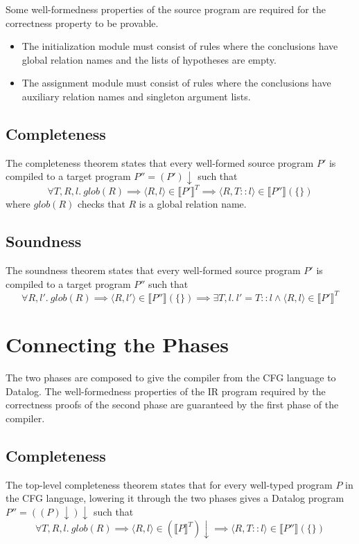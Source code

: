 \documentclass[11pt]{article}
\begin{document}
Some well-formedness properties of the source program are required for the correctness property to be provable.
\begin{itemize}
\item The initialization module must consist of rules where the conclusions have global relation names and the lists of hypotheses are empty.
\item The assignment module must consist of rules where the conclusions have auxiliary relation names and singleton argument lists.
\end{itemize}

\subsection{Completeness}
The completeness theorem states that every well-formed source program $P'$ is compiled to a target program $P'' = (P')\downarrow$ such that
\[
\forall T, R, l.~\mathit{glob}(R) \implies \langle R, l \rangle \in \llbracket P' \rrbracket^T \implies \langle R, T::l \rangle \in \llbracket P'' \rrbracket (\{\})
\]
where $\mathit{glob}(R)$ checks that $R$ is a global relation name.

\subsection{Soundness}
The soundness theorem states that every well-formed source program $P'$ is compiled to a target program $P''$ such that
\[
\forall R, l'.~\mathit{glob}(R) \implies \langle R, l' \rangle \in \llbracket P'' \rrbracket(\{\}) \implies \exists T, l.~l' = T :: l \land \langle R, l \rangle \in \llbracket P' \rrbracket^T
\]

\section{Connecting the Phases}
The two phases are composed to give the compiler from the CFG language to Datalog.
The well-formedness properties of the IR program required by the correctness proofs of the second phase are guaranteed by the first phase of the compiler.

\subsection{Completeness}
The top-level completeness theorem states that for every well-typed program $P$ in the CFG language, lowering it through the two phases gives a Datalog program $P'' = ((P)\downarrow)\downarrow$ such that
\[
\forall T, R, l.~\mathit{glob}(R) \implies \langle R, l \rangle \in (\llbracket P \rrbracket^T)\downarrow \implies \langle R, T::l \rangle \in \llbracket P'' \rrbracket (\{\})
\]
\end{document}
